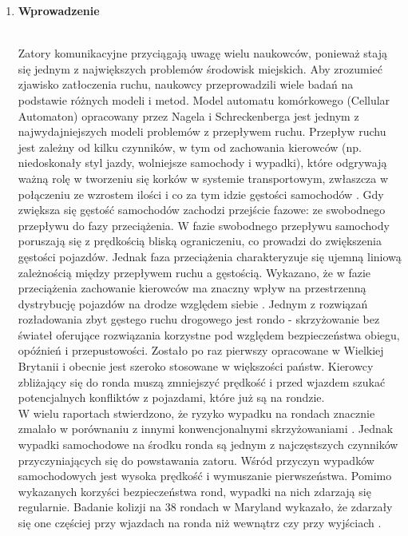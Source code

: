 \documentclass[a4paper,11pt]{article}
\begin{document}
\begin{enumerate}
	\item \textbf{{\Large Wprowadzenie}}\\ \\
		\begin{large}
		Zatory komunikacyjne przyciągają uwagę wielu naukowców, ponieważ stają się jednym z największych problemów środowisk miejskich. Aby zrozumieć zjawisko zatłoczenia ruchu, naukowcy przeprowadzili wiele badań na podstawie
różnych modeli i metod. Model automatu komórkowego (Cellular Automaton) opracowany przez Nagela i Schreckenberga \cite{nagel1992cellular} jest jednym z najwydajniejszych modeli problemów z przepływem ruchu.
Przepływ ruchu jest zależny od kilku czynników, w tym od zachowania kierowców (np. niedoskonały styl jazdy, wolniejsze samochody i wypadki), które odgrywają ważną rolę w tworzeniu się korków w systemie transportowym, zwłaszcza w połączeniu ze wzrostem ilości i co za tym idzie gęstości samochodów \cite{chowdhury2000statistical}. Gdy zwiększa się gęstość samochodów zachodzi przejście fazowe: ze swobodnego przepływu do fazy przeciążenia. W fazie swobodnego przepływu samochody poruszają się z prędkością bliską ograniczeniu, co prowadzi do zwiększenia gęstości pojazdów. Jednak faza przeciążenia charakteryzuje się ujemną liniową zależnością między przepływem ruchu a gęstością. Wykazano, że w fazie przeciążenia zachowanie kierowców ma znaczny wpływ na przestrzenną dystrybucję pojazdów na drodze
względem siebie \cite{jarai2012earthquake}.
Jednym z rozwiązań rozładowania zbyt gęstego ruchu drogowego jest rondo - skrzyżowanie bez świateł oferujące rozwiązania
korzystne pod względem bezpieczeństwa obiegu, opóźnień i przepustowości. Zostało po raz pierwszy opracowane w Wielkiej Brytanii i obecnie jest szeroko stosowane w
większości państw. Kierowcy zbliżający się do ronda muszą zmniejszyć prędkość i przed wjazdem szukać potencjalnych konfliktów z pojazdami, które już są na rondzie.\\

W wielu raportach stwierdzono, że ryzyko wypadku na rondach znacznie zmalało
w porównaniu z innymi konwencjonalnymi skrzyżowaniami \cite{persaud2001safety}. Jednak wypadki samochodowe na środku ronda są jednym z najczęstszych czynników przyczyniających się do powstawania zatoru. Wśród przyczyn wypadków samochodowych jest wysoka prędkość i wymuszanie pierwszeństwa. Pomimo wykazanych korzyści bezpieczeństwa rond, wypadki na nich zdarzają się regularnie. Badanie kolizji na 38 rondach w Maryland wykazało, że zdarzały się one częściej
przy wjazdach na ronda niż wewnątrz czy przy wyjściach \cite{mandavilli2009crash}.
		\end{large}



\end{enumerate}
\end{document}
